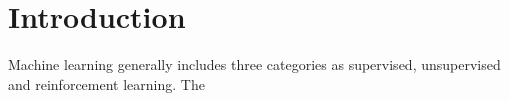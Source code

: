 \section{Introduction}

Machine learning generally includes three categories as supervised, unsupervised and reinforcement learning. The 
